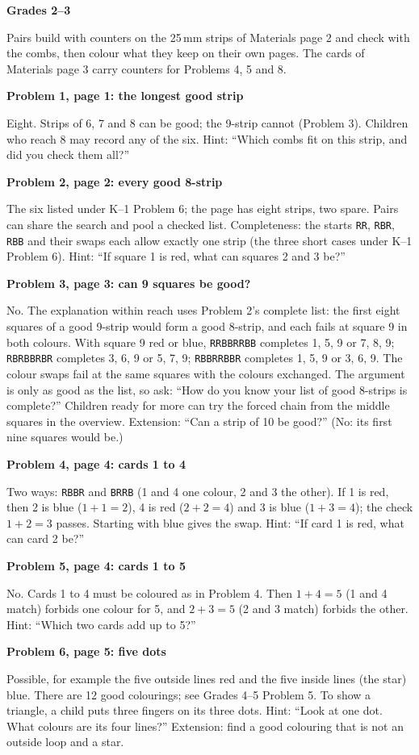 \documentclass[11pt]{article}
\newcommand{\head}[1]{\par\needspace{8\baselineskip}\medskip\textbf{\large #1}\par}
\newcommand{\sub}[1]{\par\needspace{4\baselineskip}\textbf{#1}\par}
\newcommand{\st}[1]{\texttt{#1}}
\begin{document}
\head{Grades 2--3}
Pairs build with counters on the 25\,mm strips of Materials page 2 and check with the combs, then colour what they keep on their own pages. The cards of Materials page 3 carry counters for Problems 4, 5 and 8.

\sub{Problem 1, page 1: the longest good strip}
Eight. Strips of 6, 7 and 8 can be good; the 9-strip cannot (Problem 3). Children who reach 8 may record any of the six. Hint: ``Which combs fit on this strip, and did you check them all?''

\sub{Problem 2, page 2: every good 8-strip}
The six listed under K--1 Problem 6; the page has eight strips, two spare. Pairs can share the search and pool a checked list. Completeness: the starts \st{RR}, \st{RBR}, \st{RBB} and their swaps each allow exactly one strip (the three short cases under K--1 Problem 6). Hint: ``If square 1 is red, what can squares 2 and 3 be?''

\sub{Problem 3, page 3: can 9 squares be good?}
No. The explanation within reach uses Problem 2's complete list: the first eight squares of a good 9-strip would form a good 8-strip, and each fails at square 9 in both colours. With square 9 red or blue, \st{RRBBRRBB} completes 1, 5, 9 or 7, 8, 9; \st{RBRBBRBR} completes 3, 6, 9 or 5, 7, 9; \st{RBBRRBBR} completes 1, 5, 9 or 3, 6, 9. The colour swaps fail at the same squares with the colours exchanged. The argument is only as good as the list, so ask: ``How do you know your list of good 8-strips is complete?'' Children ready for more can try the forced chain from the middle squares in the overview. Extension: ``Can a strip of 10 be good?'' (No: its first nine squares would be.)

\sub{Problem 4, page 4: cards 1 to 4}
Two ways: \st{RBBR} and \st{BRRB} (1 and 4 one colour, 2 and 3 the other). If 1 is red, then 2 is blue ($1+1=2$), 4 is red ($2+2=4$) and 3 is blue ($1+3=4$); the check $1+2=3$ passes. Starting with blue gives the swap. Hint: ``If card 1 is red, what can card 2 be?''

\sub{Problem 5, page 4: cards 1 to 5}
No. Cards 1 to 4 must be coloured as in Problem 4. Then $1+4=5$ (1 and 4 match) forbids one colour for 5, and $2+3=5$ (2 and 3 match) forbids the other. Hint: ``Which two cards add up to 5?''

\sub{Problem 6, page 5: five dots}
Possible, for example the five outside lines red and the five inside lines (the star) blue. There are 12 good colourings; see Grades 4--5 Problem 5. To show a triangle, a child puts three fingers on its three dots. Hint: ``Look at one dot. What colours are its four lines?'' Extension: find a good colouring that is not an outside loop and a star.
\end{document}

